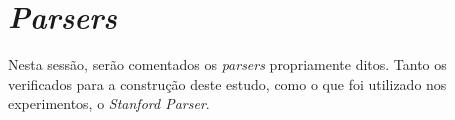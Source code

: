 \section{\textit{Parsers}}
\label{sec:parser}

Nesta sessão, serão comentados os \textit{parsers} propriamente ditos. Tanto os verificados para a construção deste estudo, como o que foi utilizado nos experimentos, o \textit{Stanford Parser}.


